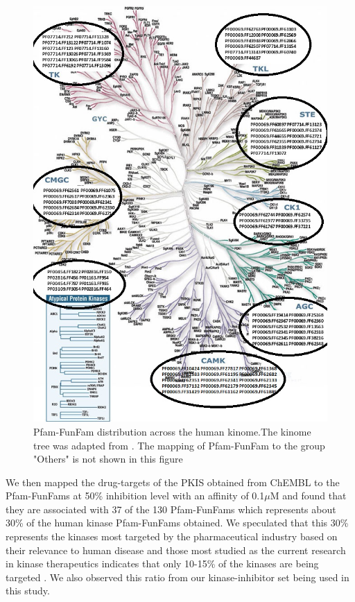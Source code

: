 \documentclass[a4paper, 11pt]{article}
\newcommand{\redcomment}[1]{\textcolor{red}{[#1]}} %
\begin{document}
\begin{figure}[H]
	\includegraphics[width=.7\linewidth]{figures/kinometree.jpg}
	\centering
	\caption{Pfam-FunFam distribution across the human kinome.The kinome tree was adapted from \cite{manning2002protein}. The mapping of Pfam-FunFam to the group "Others" is not shown in this figure}
	\label{kinasetree}
\end{figure}
We then mapped the drug-targets of the PKIS obtained from ChEMBL to the Pfam-FunFams at 50\% inhibition level with an affinity of 0.1$\mu$M and found that they are associated with 37 of the 130 Pfam-FunFams which represents about 30\% of the human kinase Pfam-FunFams obtained. We speculated that this 30\% represents the kinases most targeted by the pharmaceutical industry based on their relevance to human disease and those most studied as the current research in kinase therapeutics indicates that only 10-15\% of the kinases are being targeted \cite{li2016human, elkins2016comprehensive}. We also observed this ratio from our kinase-inhibitor set being used in this study.

\end{document}
